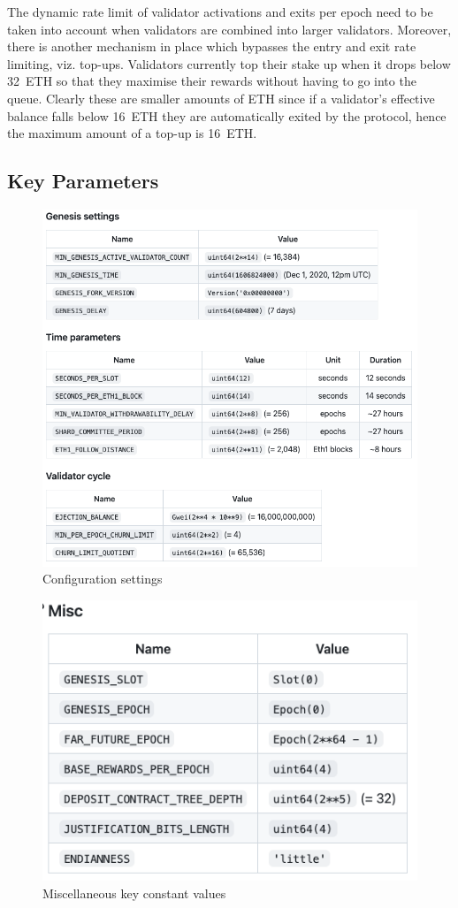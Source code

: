 \documentclass[UTF8]{article}
\begin{document}
The dynamic rate limit of validator activations and exits per epoch need to be taken into account when validators are combined into larger validators. Moreover, there is another mechanism in place which bypasses the entry and exit rate limiting, viz. top-ups. Validators currently top their stake up when it drops below 32~ETH so that they maximise their rewards without having to go into the queue. Clearly these are smaller amounts of ETH since if a validator's effective balance falls below 16~ETH they are automatically exited by the protocol, hence the maximum amount of a top-up is 16~ETH.
 \subsection{Key Parameters }
\begin{figure}[htbp]
\begin{center}
\includegraphics[width=0.7\linewidth]{images/configvalues}
\caption{Configuration settings}
\label{fig:config}
\end{center}
\end{figure}

\begin{figure}[htbp]
\begin{center}
\includegraphics[width=0.6\linewidth]{images/constants}
\caption{Miscellaneous key constant values}
\label{fig:constants}
\end{center}
\end{figure}
\end{document}
